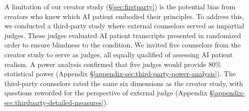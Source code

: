 \documentclass[11pt]{article}
\begin{document}
A limitation of our creator study (\S\ref{sec:firstparty}) is the potential bias from creators who knew which AI patient embodied their principles. To address this, we conducted a third-party study where external counselors served as impartial judges. These judges evaluated AI patient transcripts presented in randomized order to ensure blindness to the condition. We invited five counselors from the creator study to serve as judges, all equally qualified of assessing AI patient realism. A power analysis confirmed that five judges would provide 80\% statistical power (Appendix \S\ref{appendix-sec:third-party-power-analysis}).
The third-party counselors rated the same six dimensions as the creator study, with questions reworded for the perspective of external judge (Appendix \S\ref{appendix-sec:thirdparty-detailed-measures}). 
\end{document}
